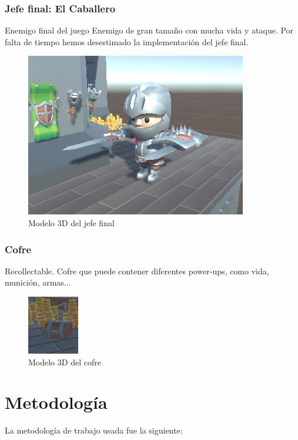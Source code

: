 \documentclass{article}
\begin{document}
\subsubsection{Jefe final: El Caballero}
    Enemigo final del juego 
    Enemigo de gran tamaño con mucha vida y ataque.
    Por falta de tiempo hemos desestimado la implementación del jefe final.
    \begin{figure}[h!]
        \centering
        \includegraphics[width=.7\textwidth]{img/6.png}
        \caption{Modelo 3D del jefe final}
    \end{figure}

\subsubsection{Cofre}
    Recollectable.
    Cofre que puede contener diferentes power-ups, como vida, munición, armas...

    \begin{figure}[h!]
        \centering
        \includegraphics[width=.4\textwidth]{img/7.png}
        \caption{Modelo 3D del cofre}
    \end{figure}
\newpage 
\section{Metodología}
    La metodología de trabajo usada fue la siguiente:
\end{document}
